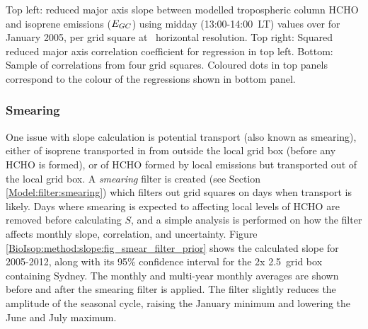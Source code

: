     { %
      Top left: reduced major axis slope between modelled tropospheric column HCHO and isoprene emissions ($E_{GC}$) using midday (13:00-14:00~LT) values over for January 2005, per grid square at \lowhr ~horizontal resolution.
      Top right: Squared reduced major axis correlation coefficient for regression in top left. 
      Bottom: Sample of correlations from four grid squares.
      Coloured dots in top panels correspond to the colour of the regressions shown in bottom panel.
    }
    {\label{BioIsop:method:slope:fig_regressions}}
    
    
    \subsubsection{Smearing}
      \label{BioIsop:method:smearing}
    One issue with slope calculation is potential transport (also known as smearing), either of isoprene transported in from outside the local grid box (before any HCHO is formed), or of HCHO formed by local emissions but transported out of the local grid box.
    A \textit{smearing} filter is created (see Section \ref{Model:filter:smearing}) which filters out grid squares on days when transport is likely.
    Days where smearing is expected to affecting local levels of HCHO are removed before calculating $S$, and a simple analysis is performed on how the filter affects monthly slope, correlation, and uncertainty.
    Figure \ref{BioIsop:method:slope:fig_smear_filter_prior} shows the calculated slope for 2005-2012, along with its 95\% confidence interval for the 2\degr x 2.5\degr ~grid box containing Sydney.
    The monthly and multi-year monthly averages are shown before and after the smearing filter is applied.
    The filter slightly reduces the amplitude of the seasonal cycle, raising the January minimum and lowering the June and July maximum.

